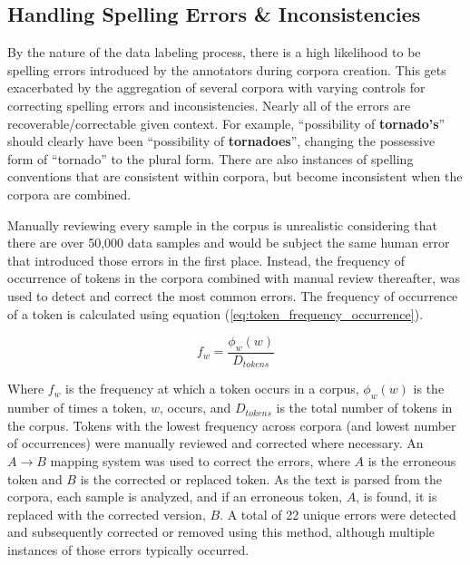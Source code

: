 \documentclass[12pt]{article}
\begin{document}
\subsection{Handling Spelling Errors \& Inconsistencies}\label{sec:spelling_errors}
By the nature of the data labeling process, there is a high likelihood to be spelling errors introduced by the annotators during corpora creation.
This gets exacerbated by the aggregation of several corpora with varying controls for correcting spelling errors and inconsistencies. Nearly all of
the errors are recoverable/correctable given context. For example, ``possibility of \textbf{tornado's}'' should clearly have been ``possibility of
\textbf{tornadoes}'', changing the possessive form of ``tornado'' to the plural form. There are also instances of spelling conventions that are
consistent within corpora, but become inconsistent when the corpora are combined.

Manually reviewing every sample in the corpus is unrealistic considering that there are over 50,000 data samples and would be subject the same
human error that introduced those errors in the first place. Instead, the frequency of occurrence of tokens in the corpora combined with manual review
thereafter, was used to detect and correct the most common errors. The frequency of occurrence of a token is calculated using equation
(\ref{eq:token_frequency_occurrence}).

\begin{equation}\label{eq:token_frequency_occurrence}
    f_w = \frac{\phi_w(w)}{D_{tokens}}
\end{equation}

\noindent
Where $f_w$ is the frequency at which a token occurs in a corpus, $\phi_w(w)$ is the number of times a token, $w$, occurs, and $D_{tokens}$ is the
total number of tokens in the corpus. Tokens with the lowest frequency across corpora (and lowest number of occurrences) were manually reviewed and
corrected where necessary. An $A \rightarrow B$ mapping system was used to correct the errors, where \(A\) is the erroneous token and \(B\) is the
corrected or replaced token. As the text is parsed from the corpora, each sample is analyzed, and if an erroneous token, $A$, is found, it is replaced
with the corrected version, $B$. A total of 22 unique errors were detected and subsequently corrected or removed using this method, although multiple
instances of those errors typically occurred.
\end{document}
